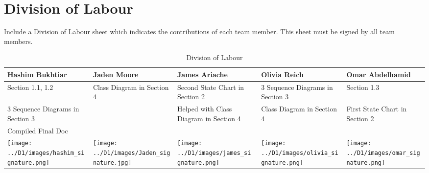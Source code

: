 \documentclass[]{article}
\begin{document}
\appendix
\section{Division of Labour}
\label{sec:division_of_labour}
Include a Division of Labour sheet which indicates the contributions of each team member. This sheet must be signed by all team members.

\begin{table}[h!]
\centering
\begin{tabular}{|p{3.5cm}|p{3.5cm}|p{3cm}|p{3.5cm}|p{3cm}|}
\hline
Hashim Bukhtiar & Jaden Moore & James Ariache & Olivia Reich & Omar Abdelhamid \\ \hline
Section 1.1, 1.2 & Class Diagram in Section 4 & Second State Chart in Section 2 & 3 Sequence Diagrams in Section 3 & Section 1.3 \\ 
3 Sequence Diagrams in Section 3 &  & Helped with Class Diagram in Section 4 & Class Diagram in Section 4 & First State Chart in Section 2 \\
Compiled Final Doc &  &  &  & \\

\texttt{[image: ../D1/images/hashim\_signature.png]} & \texttt{[image: ../D1/images/Jaden\_signature.jpg]} &
\texttt{[image: ../D1/images/james\_signature.png]}& \texttt{[image: ../D1/images/olivia\_signature.png]} & \texttt{[image: ../D1/images/omar\_signature.png]}  \\
\hline
\end{tabular}
\caption{Division of Labour} 
\label{tab:division_of_labour}
\end{table}


\newpage
\end{document}
